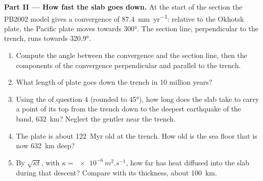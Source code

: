 \begin{problem}
\medskip
\noindent\textbf{Part II --- How fast the slab goes down.} At the start of the
section the PB2002 model gives a convergence of \qty{87.4}{mm.yr^{-1}}: relative
to the Okhotsk plate, the Pacific plate moves towards  \ang{300}. The
section line, perpendicular to the trench, runs towards  \ang{320.9}.
\begin{enumerate}[resume]
  \item Compute the angle between the convergence and the section line, then
        the components of the convergence perpendicular and parallel to the
        trench.
  \item What length of plate goes down the trench in 10 million years?
  \item Using the  of question 4 (rounded to \ang{45}), how long does the
        slab take to carry a point of its top from the trench down to the
        deepest earthquake of the band, \qty{632}{km}? Neglect the gentler
         near the trench.
  \item The plate is about \qty{122}{Myr} old at the trench. How old is the
        sea floor that is now \qty{632}{km} deep?
  \item By $\sqrt{\kappa t}$, with $\kappa = \qty{e-6}{m^2.s^{-1}}$, how far
        has heat diffused into the slab during that descent? Compare with its
        thickness, about \qty{100}{km}.
\end{enumerate}


\end{problem}
